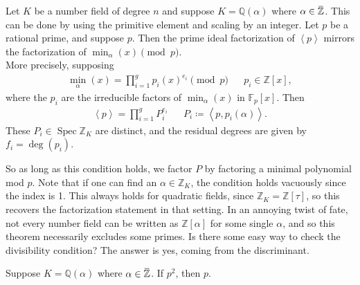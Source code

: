 \begin{theorem}

Let \(K\) be a number field of degree \(n\) and suppose
\(K = {\mathbb{Q}}(\alpha)\) where
\(\alpha\in \mkern 1.5mu\overline{\mkern-1.5mu{\mathbb{Z}}\mkern-1.5mu}\mkern 1.5mu\).
This can be done by using the primitive element and scaling by an
integer. Let \(p\) be a rational prime, and suppose
\(p%
\). Then the prime ideal factorization of
\(\left\langle{ p }\right\rangle\) mirrors the factorization of
\(\min_{\alpha}(x) \pmod p\).\\

More precisely, supposing
\begin{align*}
\min_{ \alpha}(x) = \prod_{i=1}^g p_i(x)^{e_i} \pmod p && p_i \in {\mathbb{Z}}[x]
,\end{align*}
where the \(p_i\) are the irreducible factors of \(\min_{ \alpha}(x)\)
in \({\mathbb{F}}_p[x]\). Then
\begin{align*}
\left\langle{ p }\right\rangle = \prod_{i=1}^g P_i ^{e_i} && P_i \coloneqq\left\langle{ p, p_i( \alpha) }\right\rangle 
.\end{align*}
These \(P_i \in \operatorname{Spec}{\mathbb{Z}}_K\) are distinct, and
the residual degrees are given by \(f_i = \deg(p_i)\).

\end{theorem}

\begin{remark}

So as long as this condition holds, we factor \(P\) by factoring a
minimal polynomial mod \(p\). Note that if one can find an
\(\alpha\in {\mathbb{Z}}_K\), the condition holds vacuously since the
index is 1. This always holds for quadratic fields, since
\({\mathbb{Z}}_K = {\mathbb{Z}}[\tau]\), so this recovers the
factorization statement in that setting. In an annoying twist of fate,
not every number field can be written as \({\mathbb{Z}}[ \alpha]\) for
some single \(\alpha\), and so this theorem necessarily excludes some
primes. Is there some easy way to check the divisibility condition? The
answer is yes, coming from the discriminant.

\end{remark}

\begin{proposition}[?]

Suppose \(K = {\mathbb{Q}}( \alpha)\) where
\(\alpha\in \mkern 1.5mu\overline{\mkern-1.5mu{\mathbb{Z}}\mkern-1.5mu}\mkern 1.5mu\).
If
\(p^2 %
\), then
\(p%
\).

\end{proposition}

